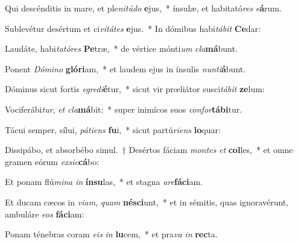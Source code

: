 \item Qui descénditis in mare, et ple\textit{ni}\textit{tú}\textit{do} \textbf{e}jus,~* ínsulæ, et habitató\textit{res} \textit{e}\textbf{á}rum.
\item Sublevétur desértum et ci\textit{vi}\textit{tá}\textit{tes} \textbf{e}jus.~* In dómibus habi\textit{tá}\textit{bit} \textbf{Ce}dar:
\item Laudáte, habi\textit{ta}\textit{tó}\textit{res} \textbf{Pe}træ,~* de vértice mónti\textit{um} \textit{cla}\textbf{má}bunt.
\item Ponent \textit{Dó}\textit{mi}\textit{no} \textbf{gló}\textbf{ri}am,~* et laudem ejus in ínsulis \textit{nun}\textit{ti}\textbf{á}bunt.
\item Dóminus sicut fortis \textit{e}\textit{gre}\textit{di}\textbf{é}tur,~* sicut vir prœliátor susci\textit{tá}\textit{bit} \textbf{ze}lum:
\item Vociferábi\textit{tur}, \textit{et} \textit{cla}\textbf{má}bit:~* super inimícos suos \textit{con}\textit{for}\textbf{tá}\textbf{bi}tur.
\item Tácui semper, sílui, \textit{pá}\textit{ti}\textit{ens} \textbf{fu}i,~* sicut partú\textit{ri}\textit{ens} \textbf{lo}quar:
\item Dissipábo, et absorbébo simul.~† Desértos fáciam \textit{mon}\textit{tes} \textit{et} \textbf{col}les,~* et omne gramen eórum \textit{ex}\textit{sic}\textbf{cá}bo:
\item Et ponam flú\textit{mi}\textit{na} \textit{in} \textbf{ín}\textbf{su}las,~* et stagna \textit{a}\textit{re}\textbf{fá}\textbf{ci}am.
\item Et ducam cæcos in \textit{vi}\textit{am}, \textit{quam} \textbf{né}\textbf{sci}unt,~* et in sémitis, quas ignoravérunt, ambuláre \textit{e}\textit{os} \textbf{fá}\textbf{ci}am:
\item Ponam ténebras coram \textit{e}\textit{is} \textit{in} \textbf{lu}cem,~* et pra\textit{va} \textit{in} \textbf{rec}ta.
